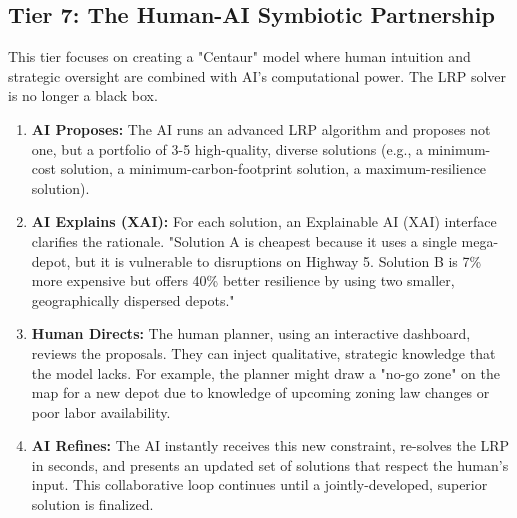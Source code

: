 \documentclass{article}
\begin{document}
\subsection{Tier 7: The Human-AI Symbiotic Partnership}
This tier focuses on creating a "Centaur" model where human intuition and strategic oversight are combined with AI's computational power. The LRP solver is no longer a black box.
\begin{enumerate}
    \item \textbf{AI Proposes:} The AI runs an advanced LRP algorithm and proposes not one, but a portfolio of
    3-5 high-quality, diverse solutions (e.g., a minimum-cost solution, a minimum-carbon-footprint solution, a maximum-resilience solution).
    \item \textbf{AI Explains (XAI):} For each solution, an Explainable AI (XAI) interface clarifies the rationale. "Solution A is cheapest because it uses a single mega-depot, but it is vulnerable to disruptions on Highway 5. Solution B is 7\% more expensive but offers 40\% better resilience by using two smaller, geographically dispersed depots."
    \item \textbf{Human Directs:} The human planner, using an interactive dashboard, reviews the proposals. They can inject qualitative, strategic knowledge that the model lacks. For example, the planner might draw a "no-go zone" on the map for a new depot due to knowledge of upcoming zoning law changes or poor labor availability.
    \item \textbf{AI Refines:} The AI instantly receives this new constraint, re-solves the LRP in seconds, and presents an updated set of solutions that respect the human's input. This collaborative loop continues until a jointly-developed, superior solution is finalized.
\end{enumerate}
\end{document}
